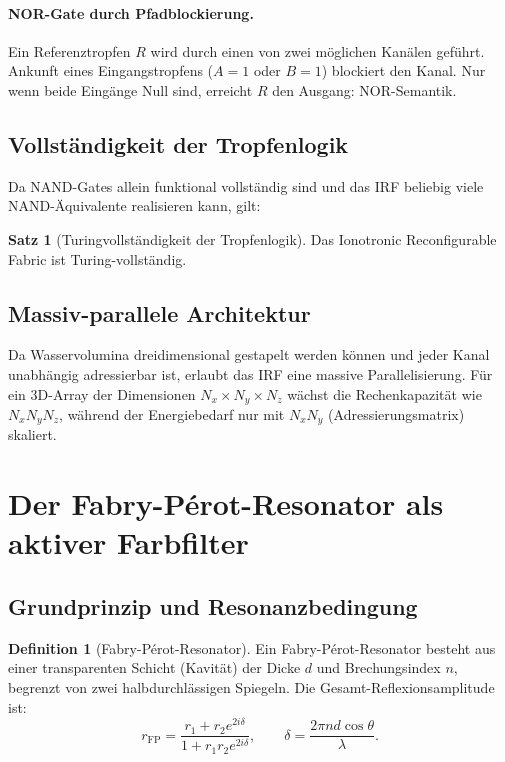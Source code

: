 ﻿\documentclass[a4paper,12pt]{scrreprt}
\theoremstyle{definition}
\newtheorem{definition}{Definition}[section]
\newtheorem{satz}{Satz}[section]
\begin{document}
\paragraph{NOR-Gate durch Pfadblockierung.}
Ein Referenztropfen $R$ wird durch einen von zwei möglichen Kanälen geführt.
Ankunft eines Eingangstropfens ($A = 1$ oder $B = 1$) blockiert den Kanal.
Nur wenn beide Eingänge Null sind, erreicht $R$ den Ausgang: NOR-Semantik.

\subsection{Vollständigkeit der Tropfenlogik}

Da NAND-Gates allein funktional vollständig sind und das IRF beliebig viele
NAND-Äquivalente realisieren kann, gilt:

\begin{satz}[Turingvollständigkeit der Tropfenlogik]
  Das Ionotronic Reconfigurable Fabric ist Turing-vollständig.
\end{satz}

\subsection{Massiv-parallele Architektur}

Da Wasservolumina dreidimensional gestapelt werden können und jeder Kanal
unabhängig adressierbar ist, erlaubt das IRF eine massive Parallelisierung.
Für ein 3D-Array der Dimensionen $N_x \times N_y \times N_z$ wächst die
Rechenkapazität wie $N_x N_y N_z$, während der Energiebedarf nur mit
$N_x N_y$ (Adressierungsmatrix) skaliert.

\section{Der Fabry-P{\'e}rot-Resonator als aktiver Farbfilter}

\subsection{Grundprinzip und Resonanzbedingung}

\begin{definition}[Fabry-Pérot-Resonator]
  Ein Fabry-P{\'e}rot-Resonator besteht aus einer transparenten Schicht
  (Kavität) der Dicke $d$ und Brechungsindex $n$, begrenzt von zwei
  halbdurchlässigen Spiegeln. Die Gesamt-Reflexionsamplitude ist:
  \begin{equation}
    r_\mathrm{FP} = \frac{r_1 + r_2 e^{2i\delta}}{1 + r_1 r_2 e^{2i\delta}},
    \qquad \delta = \frac{2\pi n d \cos\theta}{\lambda}.
    \label{eq:fp-reflexion}
  \end{equation}
\end{definition}
\end{document}
